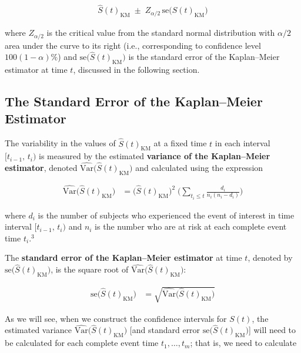 \documentclass[
]{book}
\begin{document}
\begin{align}\label{9.7}
\hat S(t)_{\mathrm{KM}} \;\pm\; Z_{\alpha/2}\,\mathrm{se}\bigl(\hat S(t)_{\mathrm{KM}}\bigr)
\tag{9.7}
\end{align}

where \(Z_{\alpha/2}\) is the critical value from the standard normal distribution with \(\alpha/2\) area under the curve to its right (i.e., corresponding to confidence level \(100(1-\alpha)\%\)) and \(\mathrm{se}\bigl(\hat S(t)_{\mathrm{KM}}\bigr)\) is the standard error of the Kaplan--Meier estimator at time \(t\), discussed in the following section.

\hypertarget{the-standard-error-of-the-kaplanmeier-estimator}{%
\subsection*{The Standard Error of the Kaplan--Meier Estimator}\label{the-standard-error-of-the-kaplanmeier-estimator}}

The variability in the values of \(\hat S(t)_{\mathrm{KM}}\) at a fixed time \(t\) in each interval \([t_{i-1},\,t_i)\) is measured by the estimated \textbf{variance of the Kaplan--Meier estimator}, denoted \(\widehat{\mathrm{Var}}\bigl(\hat S(t)_{\mathrm{KM}}\bigr)\) and calculated using the expression

\begin{align}\label{9.8}
\widehat{\mathrm{Var}}\bigl(\hat S(t)_{\mathrm{KM}}\bigr)
&= \bigl(\hat S(t)_{\mathrm{KM}}\bigr)^2 \;\biggl(\sum_{t_i \le t}\frac{d_i}{n_i(n_i - d_i)}\biggr)
\tag{9.8}
\end{align}

where \(d_i\) is the number of subjects who experienced the event of interest in time interval \([t_{i-1},\,t_i)\) and \(n_i\) is the number who are at risk at each complete event time \(t_i\).\(^3\)

The \textbf{standard error of the Kaplan--Meier estimator} at time \(t\), denoted by \(\mathrm{se}\bigl(\hat S(t)_{\mathrm{KM}}\bigr)\), is the square root of \(\widehat{\mathrm{Var}}\bigl(\hat S(t)_{\mathrm{KM}}\bigr)\):

\begin{align}\label{9.9}
\mathrm{se}\bigl(\hat S(t)_{\mathrm{KM}}\bigr)
&= \sqrt{\widehat{\mathrm{Var}}\bigl(\hat S(t)_{\mathrm{KM}}\bigr)}
\tag{9.9}
\end{align}

As we will see, when we construct the confidence intervals for \(S(t)\), the estimated variance \(\widehat{\mathrm{Var}}\bigl(\hat S(t)_{\mathrm{KM}}\bigr)\) {[}and standard error \(\mathrm{se}\bigl(\hat S(t)_{\mathrm{KM}}\bigr)\){]} will need to be calculated for each complete event time \(t_1,\dots,t_m\); that is, we need to calculate
\end{document}
